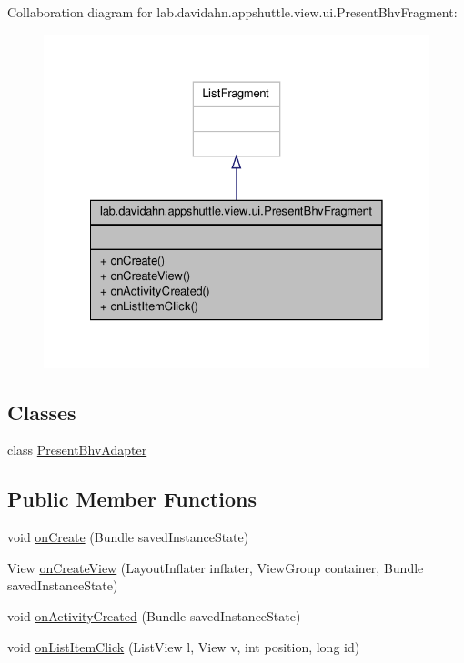 \-Collaboration diagram for lab.\-davidahn.\-appshuttle.\-view.\-ui.\-Present\-Bhv\-Fragment\-:
\nopagebreak
\begin{figure}[H]
\begin{center}
\leavevmode
\includegraphics[width=328pt]{classlab_1_1davidahn_1_1appshuttle_1_1view_1_1ui_1_1_present_bhv_fragment__coll__graph}
\end{center}
\end{figure}
\subsection*{\-Classes}
\begin{DoxyCompactItemize}
\item 
class \hyperlink{classlab_1_1davidahn_1_1appshuttle_1_1view_1_1ui_1_1_present_bhv_fragment_1_1_present_bhv_adapter}{\-Present\-Bhv\-Adapter}
\end{DoxyCompactItemize}
\subsection*{\-Public \-Member \-Functions}
\begin{DoxyCompactItemize}
\item 
void \hyperlink{classlab_1_1davidahn_1_1appshuttle_1_1view_1_1ui_1_1_present_bhv_fragment_a280feec6a959fe62d06592c67d0ce63f}{on\-Create} (\-Bundle saved\-Instance\-State)
\item 
\-View \hyperlink{classlab_1_1davidahn_1_1appshuttle_1_1view_1_1ui_1_1_present_bhv_fragment_ae7839bcf0b398a67a6ae9fa24e400fad}{on\-Create\-View} (\-Layout\-Inflater inflater, \-View\-Group container, \-Bundle saved\-Instance\-State)
\item 
void \hyperlink{classlab_1_1davidahn_1_1appshuttle_1_1view_1_1ui_1_1_present_bhv_fragment_a3bcae0b429cddfec04833dd2de8e817f}{on\-Activity\-Created} (\-Bundle saved\-Instance\-State)
\item 
void \hyperlink{classlab_1_1davidahn_1_1appshuttle_1_1view_1_1ui_1_1_present_bhv_fragment_acd4463cc478da3595ed8e421df544b4c}{on\-List\-Item\-Click} (\-List\-View l, \-View v, int position, long id)
\end{DoxyCompactItemize}


